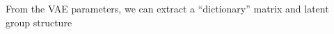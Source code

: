 \documentclass[
  ignorenonframetext,
  aspectratio=169]{beamer}
\begin{document}
\begin{frame}{From the VAE parameters, we can extract a ``dictionary''
matrix and latent group structure}
\protect\hypertarget{from-the-vae-parameters-we-can-extract-a-dictionary-matrix-and-latent-group-structure}{}
\begin{columns}[T]
\begin{column}{.8\textwidth}
\scriptsize


\normalsize
\end{column}

\begin{column}{.15\textwidth}
\end{column}
\end{columns}

\begin{columns}[T]
\begin{column}{.8\textwidth}
\scriptsize


\normalsize
\end{column}

\begin{column}{.15\textwidth}
\scriptsize


\normalsize
\end{column}
\end{columns}
\end{frame}
\end{document}
